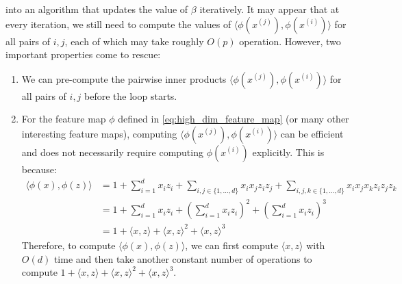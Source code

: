 into an algorithm that updates the value of $\beta$ iteratively. It may appear that
at every iteration, we still need to compute the values of $\langle \phi(x^{(j)}),\phi(x^{(i)})\rangle$ for
all pairs of $i,j$, each of which may take roughly $O(p)$ operation. However,
two important properties come to rescue:
\begin{enumerate}
    \item We can pre-compute the pairwise inner products $\langle\phi(x^{(j)}),\phi(x^{(i)})\rangle$ for all pairs of $i,j$ before the loop starts.
    \item For the feature map $\phi$ defined in \ref{eq:high_dim_feature_map} (or many other interesting
          feature maps), computing $\langle\phi(x^{(j)}),\phi(x^{(i)})\rangle$ can be efficient and does not
          necessarily require computing $\phi(x^{(i)})$ explicitly. This is because:
          \begin{align}
            \langle\phi(x),\phi(z)\rangle &= 1 + \sum_{i=1}^d x_i z_i + \sum_{i,j\in\{1,\ldots,d\}} x_i x_j z_i z_j + \sum_{i,j,k \in \{1,\ldots,d\}} x_i x_j x_k z_i z_j z_k\\
            &= 1 + \sum_{i=1}^d x_i z_i + \left(\sum_{i=1}^d x_i z_i \right)^2 + \left( \sum_{i=1}^d x_i z_i \right)^3\\
            &= 1 + \langle x,z \rangle + \langle x,z \rangle^2 + \langle x,z \rangle^3\label{eq:efficient_inner_prod}
          \end{align}
          Therefore, to compute $\langle\phi(x),\phi(z)\rangle$, we can first compute $\langle x,z\rangle$ with
          $O(d)$ time and then take another constant number of operations to compute
          $1 + \langle x,z\rangle + \langle x,z\rangle^2 + \langle x,z\rangle^3$.
\end{enumerate}

